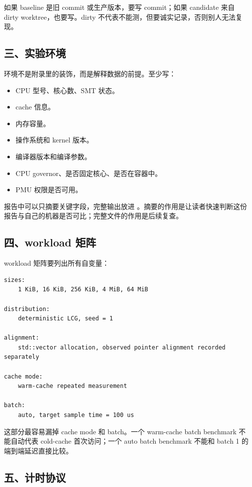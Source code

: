 如果 baseline 是旧 commit 或生产版本，要写 commit；如果 candidate 来自 dirty worktree，也要写。dirty 不代表不能测，但要诚实记录，否则别人无法复现。

\subsection{三、实验环境}

环境不是附录里的装饰，而是解释数据的前提。至少写：

\begin{itemize}
  \item CPU 型号、核心数、SMT 状态。
  \item cache 信息。
  \item 内存容量。
  \item 操作系统和 kernel 版本。
  \item 编译器版本和编译参数。
  \item CPU governor、是否固定核心、是否在容器中。
  \item PMU 权限是否可用。
\end{itemize}

报告中可以只摘要关键字段，完整输出放进 。摘要的作用是让读者快速判断这份报告与自己的机器是否可比；完整文件的作用是后续复查。

\subsection{四、workload 矩阵}

workload 矩阵要列出所有自变量：

\begin{lstlisting}
sizes:
    1 KiB, 16 KiB, 256 KiB, 4 MiB, 64 MiB

distribution:
    deterministic LCG, seed = 1

alignment:
    std::vector allocation, observed pointer alignment recorded separately

cache mode:
    warm-cache repeated measurement

batch:
    auto, target sample time = 100 us
\end{lstlisting}

这部分最容易漏掉 cache mode 和 batch。一个 warm-cache batch benchmark 不能自动代表 cold-cache 首次访问；一个 auto batch benchmark 不能和 batch 1 的端到端延迟直接比较。

\subsection{五、计时协议}

